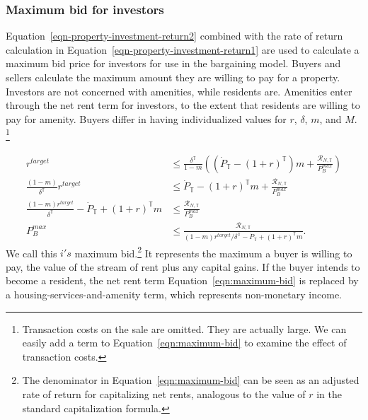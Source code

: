 \subsubsection{Maximum bid for investors}
Equation~\ref{eqn-property-investment-return2} combined with the rate of return calculation in Equation~\ref{eqn-property-investment-return1} are used to calculate a maximum bid price for investors for use in the bargaining model.
% 
Buyers and sellers calculate the maximum amount they are willing to pay for a property.  Investors are not concerned with amenities, while residents are. %
Amenities enter through the net rent term for investors, to the extent that residents are willing to pay for amenity. Buyers differ in having individualized values for $r$, $\delta$, $m$, and $M$.%
\footnote{Transaction costs on the sale are omitted. They are actually large. We can easily add a term to  Equation~\ref{eqn:maximum-bid} to examine the effect of transaction costs.} %

\begin{align}
r^{target}& \le \frac{\delta^\mathbb{T}}{1-m} \left((\dot P_\mathbb{T} - (1+r)^\mathbb{T})m  + \frac{\mathcal{R}_{N, \mathbb{T}}}{P_B^{max}}\right)\nonumber\\
\frac{(1-m)}{\delta^\mathbb{T}}r^{target} &\le \dot P_\mathbb{T} - (1+r)^\mathbb{T}m  +   \frac{\mathcal{R}_{N, \mathbb{T}}}{P_B^{max}} \nonumber\\
\frac{(1-m)r^{target}}{\delta^\mathbb{T}} - \dot P_\mathbb{T} + (1+r)^\mathbb{T}m &\le  \frac{\mathcal{R}_{N, \mathbb{T}}}{P_B^{max}}\nonumber\\
P_B^{max} &\le  \frac{\mathcal{R}_{N, \mathbb{T}}}{(1-m)r^{target}/\delta^\mathbb{T} - \dot P_\mathbb{T} + (1+r)^\mathbb{T}m}. \label{eqn:maximum-bid}
\end{align}
We call this  $i's$ maximum bid.\footnote{The denominator in Equation~\ref{eqn:maximum-bid} can be seen as an adjusted rate of return for capitalizing net rents, analogous to the value of $r$ in the standard capitalization formula.} 
It represents the maximum a buyer is willing to pay, the value of the stream of rent plus any capital gains. %
If the buyer intends to become a resident, the net rent term Equation~\ref{eqn:maximum-bid} is replaced by a housing-services-and-amenity term, which represents non-monetary income. %

